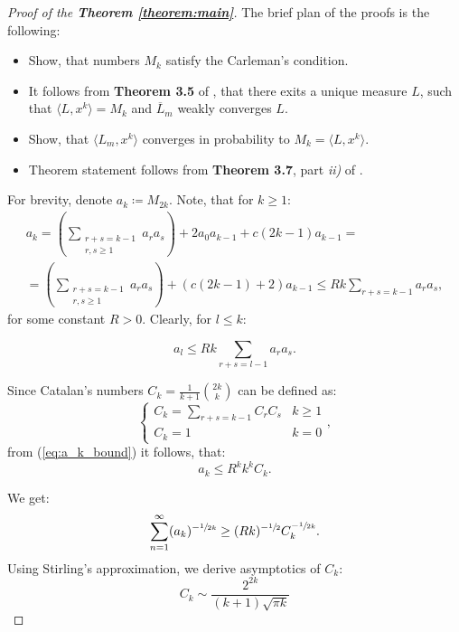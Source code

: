 \documentclass{article}
\begin{document}
\begin{proof}[Proof of the \textbf{Theorem \ref{theorem:main}}]
	The brief plan of the proofs is the following:
	\begin{itemize}
		\item Show, that numbers $M_k$ satisfy the Carleman's condition.
		
		\item It follows from \textbf{Theorem 3.5} of \cite{randmatrgeneral}, that there exits a unique measure $L$, such that $\langle L, x^k \rangle = M_k$ and $\overline{L}_m$ weakly converges $L$.
		
		\item Show, that $\langle L_m, x^k \rangle$ converges in probability to $M_k = \langle L, x^k \rangle$.
		
		\item Theorem statement follows from \textbf{Theorem 3.7}, part \emph{ii)} of \cite{randmatrgeneral}.
	\end{itemize}
	For brevity, denote $a_k \coloneqq M_{2k}$. Note, that for $k \geq 1$:
	\begin{multline}
		a_{k} = \left(\sum\limits_{\substack{r + s = k - 1 \\ r, s \geq 1}}a_ra_s\right) + 2a_0a_{k - 1} + c(2k - 1)a_{k - 1} = \\ = \left(\sum\limits_{\substack{r + s = k - 1 \\ r, s \geq 1}}a_ra_s\right) + (c(2k - 1) + 2)a_{k - 1} \leq Rk \sum\limits_{r + s = k - 1}a_ra_s,
	\end{multline}
	for some constant $R > 0$. Clearly, for $l \leq k$:
	
	\begin{equation}\label{eq:a_k_bound}
		a_{l} \leq Rk\sum\limits_{r + s = l - 1}a_{r}a_{s}.
	\end{equation}
	
	Since Catalan's numbers $C_k = \frac{1}{k + 1}\binom{2k}{k}$ can be defined as:
	$$
	\begin{cases}
		C_k = \sum\limits_{r + s = k - 1}C_rC_s  & k \geq 1\\
		C_k = 1 & k = 0
	\end{cases},
	$$
	from (\ref{eq:a_k_bound}) it follows, that: 
	$$
		a_{k} \leq R^kk^kC_k. 
	$$
	

	We get:
	\begin{equation}\label{eq:checking_carleman}
		\sum\limits_{n = 1}^{\infty}(a_k)^{-\sfrac{1}{2k}} \geq (Rk)^{-\sfrac{1}{2}}C_k^{-\sfrac{1}{2k}}.
	\end{equation}
	Using Stirling's approximation, we derive asymptotics of $C_k$:
	$$
	C_k \sim \frac{2^{2k}}{(k + 1)\sqrt{\pi k}}
	$$
	

\end{proof}
\end{document}

